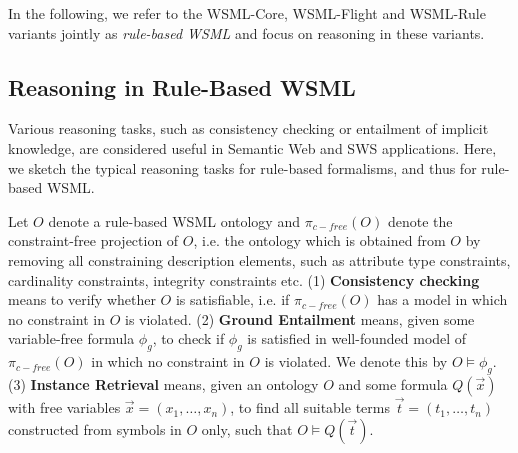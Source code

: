 In the following, we refer to the WSML-Core, WSML-Flight and
WSML-Rule variants jointly as \emph{rule-based WSML} and focus on
reasoning in these variants.

\subsection{Reasoning in Rule-Based WSML}
Various reasoning tasks, such as consistency checking or
entailment of implicit knowledge, are considered useful in
Semantic Web and SWS applications. Here, we sketch the typical
reasoning tasks for rule-based formalisms, and thus for rule-based
WSML.

Let $O$ denote a rule-based WSML ontology and $\pi_{c-free}(O)$
denote the constraint-free projection of $O$, i.e. the ontology
which is obtained from $O$ by removing all constraining
description elements, such as attribute type constraints,
cardinality constraints, integrity constraints etc. (1) {\bf
Consistency checking} means to verify whether $O$ is satisfiable,
i.e. if $\pi_{c-free}(O)$ has a model in which no constraint in
$O$ is violated. (2) {\bf Ground Entailment} means, given some
variable-free formula $\phi_g$, to check if $\phi_g$ is satisfied
in well-founded model of $\pi_{c-free}(O)$ in which no constraint
in $O$ is violated. We denote this by $O \models \phi_g$. (3) {\bf
Instance Retrieval} means, given an ontology $O$ and some formula
$Q(\vec{x})$ with free variables $\vec{x} = (x_1,\ldots,x_n)$, to
find all suitable terms $\vec{t} = (t_1,\ldots,t_n)$ constructed
from symbols in $O$ only, such that $O \models Q(\vec{t})$.
